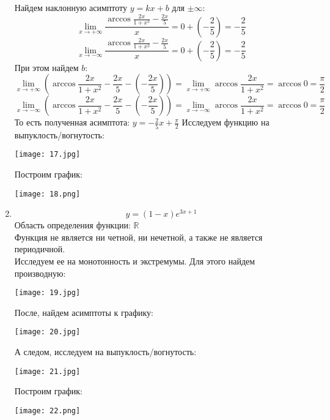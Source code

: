 \begin{enumerate}
    Найдем наклонную асимптоту $y=kx+b$ для $\pm \infty$:\\
    \[\lim_{x\rightarrow +\infty}{\frac{\arccos{\frac{2x}{1+x^2}} - \frac{2x}{5}}{x}}=
    0+\left(-\frac{2}{5}\right)=-\frac{2}{5}
    \]
    \[\lim_{x\rightarrow -\infty}{\frac{\arccos{\frac{2x}{1+x^2}} - \frac{2x}{5}}{x}}=
    0+\left(-\frac{2}{5}\right)=-\frac{2}{5}
    \]
    При этом найдем $b$:
    \[\lim_{x\rightarrow +\infty}{\left(\arccos{\frac{2x}{1+x^2}} - \frac{2x}{5} - \left(-\frac{2x}{5}\right)\right)} = 
    \lim_{x\rightarrow +\infty}{\arccos{\frac{2x}{1+x^2}}} = \arccos{0} = \frac{\pi}{2}
    \]
    \[\lim_{x\rightarrow -\infty}{\left(\arccos{\frac{2x}{1+x^2}} - \frac{2x}{5} - \left(-\frac{2x}{5}\right)\right)} = 
    \lim_{x\rightarrow -\infty}{\arccos{\frac{2x}{1+x^2}}} = \arccos{0} = \frac{\pi}{2}
    \]
    То есть полученная асимптота: $y = -\frac{2}{5}x+\frac{\pi}{2}$
    Исследуем функцию на выпуклость/вогнутость: \\
    \begin{center}\texttt{[image: 17.jpg]}\end{center}
    Построим график: \\
    \begin{center}\texttt{[image: 18.png]}\end{center}
    \item 
    \[
        y = (1-x)e^{3x+1}
    \]
    Область определения функции: $\mathbb{R}$ \\
    Функция не является ни четной, ни нечетной, а также не является периодичной. \\
    Исследуем ее на монотонность и экстремумы. Для этого найдем производную: \\
    \begin{center}\texttt{[image: 19.jpg]}\end{center}
    После, найдем асимптоты к графику:\\
    \begin{center}\texttt{[image: 20.jpg]}\end{center}
    А следом, исследуем на выпуклость/вогнутость:\\
    \begin{center}\texttt{[image: 21.jpg]}\end{center}
    Построим график:\\
    \begin{center}\texttt{[image: 22.png]}\end{center}
\end{enumerate}